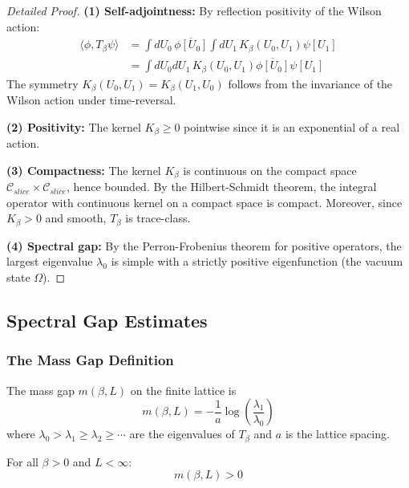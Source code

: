 \begin{proof}[Detailed Proof]
\textbf{(1) Self-adjointness:} By reflection positivity of the Wilson action:
\begin{align}
    \langle \phi, T_\beta \psi \rangle &= \int dU_0 \, \overline{\phi[U_0]} \int dU_1 \, K_\beta(U_0, U_1) \psi[U_1] \\
    &= \int dU_0 dU_1 \, K_\beta(U_0, U_1) \overline{\phi[U_0]} \psi[U_1]
\end{align}
The symmetry $K_\beta(U_0, U_1) = K_\beta(U_1, U_0)$ follows from the invariance of the Wilson action under time-reversal.

\textbf{(2) Positivity:} The kernel $K_\beta \geq 0$ pointwise since it is an exponential of a real action.

\textbf{(3) Compactness:} The kernel $K_\beta$ is continuous on the compact space $\mathcal{C}_{slice} \times \mathcal{C}_{slice}$, hence bounded. By the Hilbert-Schmidt theorem, the integral operator with continuous kernel on a compact space is compact. Moreover, since $K_\beta > 0$ and smooth, $T_\beta$ is trace-class.

\textbf{(4) Spectral gap:} By the Perron-Frobenius theorem for positive operators, the largest eigenvalue $\lambda_0$ is simple with a strictly positive eigenfunction (the vacuum state $\Omega$).
\end{proof}

\subsection{Spectral Gap Estimates}

\subsubsection{The Mass Gap Definition}

\begin{definition}\label{def:mass-gap-precise}
The mass gap $m(\beta, L)$ on the finite lattice is
\begin{equation}
    m(\beta, L) = -\frac{1}{a} \log\left(\frac{\lambda_1}{\lambda_0}\right)
\end{equation}
where $\lambda_0 > \lambda_1 \geq \lambda_2 \geq \cdots$ are the eigenvalues of $T_\beta$ and $a$ is the lattice spacing.
\end{definition}

\begin{theorem}\label{thm:gap-positive}
For all $\beta > 0$ and $L < \infty$:
\begin{equation}
    m(\beta, L) > 0
\end{equation}
\end{theorem}

